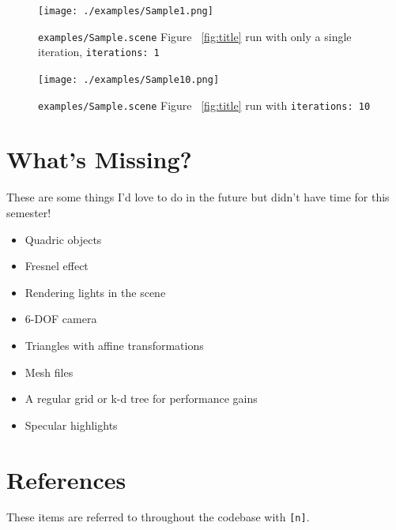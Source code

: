 \documentclass{article}
\begin{document}
\begin{figure}[H]
    \texttt{[image: ./examples/Sample1.png]}
    \caption{\texttt{examples/Sample.scene} Figure ~\ref{fig:title} run with only a single iteration, \texttt{iterations: 1}}
\end{figure}

\begin{figure}[H]
    \texttt{[image: ./examples/Sample10.png]}
    \caption{\texttt{examples/Sample.scene} Figure ~\ref{fig:title} run with \texttt{iterations: 10}}
\end{figure}


\section{What's Missing?}

These are some things I'd love to do in the future but didn't have time for this semester!

\begin{itemize}
    \item Quadric objects
    \item Fresnel effect
    \item Rendering lights in the scene
    \item 6-DOF camera
    \item Triangles with affine transformations
    \item Mesh files
    \item A regular grid or k-d tree for performance gains
    \item Specular highlights
\end{itemize}

\section{References}

These items are referred to throughout the codebase with \texttt{[n]}.
\end{document}
